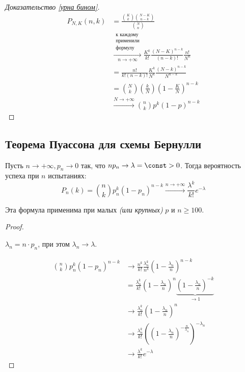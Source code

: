 \begin{proof}[Доказательство \ref{урна бином}]
    \begin{align*}
        P_{N, K}(n, k) & = \frac{\binom{K}{k} \binom{N - K}{n - k}}{\binom{N}{n}}                         \\
                       & \xrightarrow[n \to +\infty]{\substack{\text{к каждому}                           \\ \text{применили} \\ \text{формулу}}} \frac{K^k}{k!} \frac{(N-K)^{n-k}}{(n-k)!} \frac{n!}{N^n}   \\
                       & = \frac{n!}{k!(n - k)!} \frac{K^k}{N^k} \frac{(N - k)^{n - k}}{N^{n - k}}        \\
                       & = \binom{N}{k} \left( \frac{k}{N} \right) \left( 1 - \frac{K}{N} \right)^{n - k} \\
                       & \xrightarrow{N \to +\infty} \binom{n}{k} p^k (1 - p)^{n - k}
    \end{align*}
\end{proof}

\subsection{Теорема Пуассона для схемы Бернулли}

\begin{theorem}
    Пусть \(n \to +\infty, p_n \to 0\) так, что \(n p_n \to \lambda =\const > 0\). Тогда вероятность успеха при \(n\) испытаниях:
    \[P_n(k) = \binom{n}{k}p_n^k (1 - p_n)^{n - k} \xrightarrow{n \to +\infty} \frac{\lambda^k}{k!}e^{ - \lambda} \]

    Эта формула применима при малых \textit{(или крупных)} \(p\) и \(n \geq 100\).
\end{theorem}
\begin{proof}
    \begin{obozn}
        \(\lambda_n = n\cdot p_n\), при этом \(\lambda_n \to \lambda\).
    \end{obozn}

    \begin{align*}
        \binom{n}{k}p_n^k (1 - p_n)^{n - k} & \to \frac{n^k}{k!} \frac{\lambda_n^k}{n^k} \left( 1 - \frac{\lambda_n}{n} \right)^{n - k}                                             \\
                                            & = \frac{\lambda_n^k}{k!} \left( 1 - \frac{\lambda_n}{n} \right)^{n} \underbrace{\left( 1 - \frac{\lambda_n}{n} \right)^{- k}}_{\to 1} \\
                                            & \to \frac{\lambda_n^k}{k!} \left( 1 - \frac{\lambda_n}{n} \right)^{n}                                                                 \\
                                            & \to \frac{\lambda_n^k}{k!} \left(\left( 1 - \frac{\lambda_n}{n} \right)^{ - \frac{n}{\lambda_n} } \right)^{ - \lambda_n}              \\
                                            & \to \frac{\lambda^k}{k!}e^{ - \lambda}
    \end{align*}
\end{proof}

